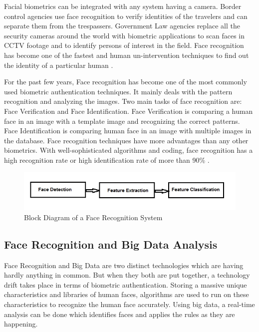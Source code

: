 \documentclass[sigconf]{acmart}
\begin{document}
Facial biometrics can be integrated with any system having a camera. Border control agencies use face recognition to verify identities of the travelers and can separate them from the trespassers. Government Law agencies replace all the security cameras around the world with biometric applications to scan faces in CCTV footage and to identify persons of interest in the field. Face recognition has become one of the fastest and human un-intervention techniques to find out the identity of a particular human \cite{biometrics2016}.

For the past few years, Face recognition has become one of the most commonly used biometric authentication techniques. It mainly deals with the pattern recognition and analyzing the images. Two main tasks of face recognition are: Face Verification and Face Identification. Face Verification is comparing a human face in an image with a template image and recognizing the correct patterns. Face Identification is comparing human face in an image with multiple images in the database. Face recognition techniques have more advantages than any other biometrics. With well-sophisticated algorithms and coding, face recognition has a high recognition rate or high identification rate of more than 90\% \cite{riddhi2013}. 

\begin{figure}[ht!]
  \includegraphics[width=\columnwidth]{images/Face-recognition.jpg}
  \caption{Block Diagram of a Face Recognition System}
\end{figure}

\subsection{Face Recognition and Big Data Analysis}

Face Recognition and Big Data are two distinct technologies which are having hardly anything in common. But when they both are put together, a technology drift takes place in terms of biometric authentication. Storing a massive unique characteristics and libraries of human faces, algorithms are used to run on these characteristics to recognize the human face accurately. Using big data, a real-time analysis can be done which identifies faces and applies the rules as they are happening.
\end{document}
